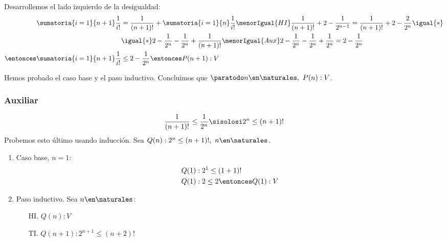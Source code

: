 \begin{enumerate}[label=\roman*)]
\begin{enumerate}[label=\arabic*)]
                Desarrollemos el lado izquierdo de la desigualdad:
                \begin{align*}
                  \sumatoria{i=1}{n+1} \frac{1}{i!}          & = \frac{1}{(n+1)!} + \sumatoria{i=1}{n} \frac{1}{i!} \menorIgual{HI}
                  \frac{1}{(n+1)!} + 2 - \frac{1}{2^{n-1}} = \frac{1}{(n+1)!} + 2 - \frac{2}{2^{n}} \igual{*}                                             \\
                                                         & \igual{*}  2 - \frac{1}{2^{n}} - \frac{1}{2^{n}} + \frac{1}{(n+1)!} \menorIgual{Aux}
                  2 - \frac{1}{2^{n}} - \frac{1}{2^{n}} + \frac{1}{2^{n}} = 2 - \frac{1}{2^{n}}                                                                \\
                  \entonces \sumatoria{i=1}{n+1} \frac{1}{i!} & \leq 2 - \frac{1}{2^{n}} \entonces P(n+1):V
                \end{align*}
        \end{enumerate}

        Hemos probado el caso base y el paso inductivo. Concluimos que $\paratodo n \en \naturales, \ P(n): V$.

        \subsubsection*{Auxiliar}
        \begin{align*}
          \frac{1}{(n+1)!} \leq \frac{1}{2^n} \sisolosi 2^n \leq (n+1)!
        \end{align*}
        Probemos esto último usando inducción. Sea $Q(n): 2^n \leq (n+1)!, \ n \en \naturales$.

        \begin{enumerate}[label=\arabic*)]
          \item Caso base, $n = 1$:
                \begin{align*}
                  Q(1) & : 2^1 \leq (1+1)!          \\
                  Q(1) & : 2 \leq 2 \entonces Q(1):V
                \end{align*}
          \item Paso inductivo. Sea $n \en \naturales$:
                \begin{enumerate}
                  \item[HI.] $Q(n): V$
                  \item[TI.] $Q(n+1): 2^{n+1} \leq (n+2)! $
                \end{enumerate}


\end{enumerate}
\end{enumerate}
